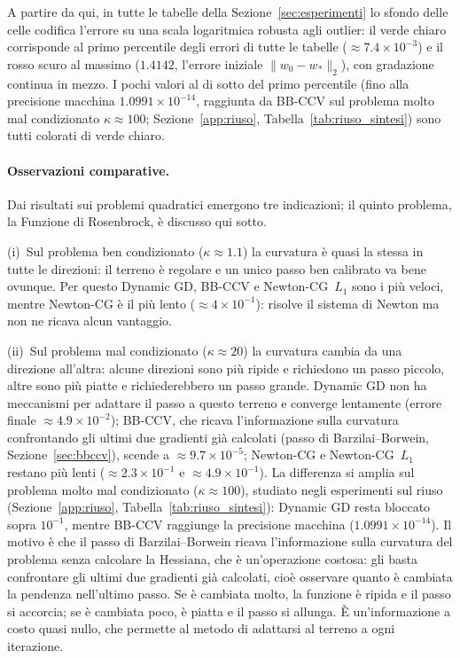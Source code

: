 \documentclass[a4paper,12pt]{article}
\numberwithin{equation}{section}
\numberwithin{figure}{section}
\numberwithin{table}{section}
\begin{document}
A partire da qui, in tutte le tabelle della Sezione~\ref{sec:esperimenti} lo sfondo delle celle
codifica l'errore su una scala logaritmica robusta agli outlier: il verde
chiaro corrisponde al primo percentile degli errori di tutte le tabelle
($\approx 7.4\times10^{-3}$) e il rosso scuro al massimo ($1.4142$, l'errore
iniziale $\|w_0-w_*\|_2$), con gradazione continua in mezzo. I pochi valori
al di sotto del primo percentile (fino alla precisione macchina
$1.0991\times10^{-14}$, raggiunta da BB-CCV sul problema molto mal condizionato
$\kappa\approx100$; Sezione~\ref{app:riuso},
Tabella~\ref{tab:riuso_sintesi}) sono tutti colorati di verde chiaro.

\paragraph{Osservazioni comparative.} Dai risultati sui problemi quadratici
emergono tre indicazioni; il quinto problema, la Funzione di Rosenbrock, è
discusso qui sotto.

(i)~Sul problema ben condizionato ($\kappa \approx 1.1$) la curvatura è quasi
la stessa in tutte le direzioni: il terreno è regolare e un unico passo ben
calibrato va bene ovunque. Per questo Dynamic GD, BB-CCV e Newton-CG~$L_1$
sono i più veloci, mentre Newton-CG è il più lento
($\approx 4\times10^{-1}$): risolve il sistema di Newton ma non ne ricava
alcun vantaggio.

(ii)~Sul problema mal condizionato ($\kappa \approx 20$) la curvatura cambia da
una direzione all'altra: alcune direzioni sono più ripide e richiedono un
passo piccolo, altre sono più piatte e richiederebbero un passo grande.
Dynamic GD non ha meccanismi per adattare il passo a questo terreno e
converge lentamente (errore finale $\approx4.9\times10^{-2}$); BB-CCV, che
ricava l'informazione sulla curvatura confrontando gli ultimi due gradienti
già calcolati (passo di Barzilai--Borwein, Sezione~\ref{sec:bbccv}), scende a
$\approx9.7\times10^{-5}$; Newton-CG e Newton-CG~$L_1$ restano più lenti
($\approx2.3\times10^{-1}$ e $\approx4.9\times10^{-1}$). La differenza si
amplia sul problema molto mal condizionato ($\kappa \approx 100$), studiato
negli esperimenti sul riuso (Sezione~\ref{app:riuso},
Tabella~\ref{tab:riuso_sintesi}): Dynamic GD resta bloccato sopra $10^{-1}$,
mentre BB-CCV raggiunge la precisione macchina
($1.0991\times10^{-14}$). Il motivo è che il passo di Barzilai--Borwein
ricava l'informazione sulla curvatura del problema senza calcolare la
Hessiana, che è un'operazione costosa: gli basta confrontare gli ultimi due
gradienti già calcolati, cioè osservare quanto è cambiata la pendenza
nell'ultimo passo. Se è cambiata molto, la funzione è ripida e il passo si
accorcia; se è cambiata poco, è piatta e il passo si allunga. È
un'informazione a costo quasi nullo, che permette al metodo di adattarsi al
terreno a ogni iterazione.
\end{document}
